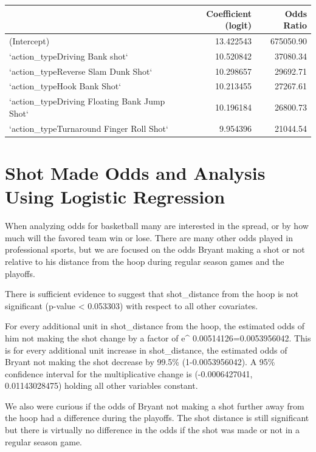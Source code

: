 \documentclass[american,]{article}
\begin{document}
\begin{table}[H]
\centering
\begin{tabular}{lrr}
\toprule
  & Coefficient (logit) & Odds Ratio\\
\midrule
\rowcolor{gray!6}  (Intercept) & 13.422543 & 675050.90\\
`action\_typeDriving Bank shot` & 10.520842 & 37080.34\\
\rowcolor{gray!6}  `action\_typeReverse Slam Dunk Shot` & 10.298657 & 29692.71\\
`action\_typeHook Bank Shot` & 10.213455 & 27267.61\\
\rowcolor{gray!6}  `action\_typeDriving Floating Bank Jump Shot` & 10.196184 & 26800.73\\
\addlinespace
`action\_typeTurnaround Finger Roll Shot` & 9.954396 & 21044.54\\
\bottomrule
\end{tabular}
\end{table}

\hypertarget{shot-made-odds-and-analysis-using-logistic-regression}{%
\section{\texorpdfstring{\textbf{Shot Made Odds and Analysis Using Logistic Regression}}{Shot Made Odds and Analysis Using Logistic Regression}}\label{shot-made-odds-and-analysis-using-logistic-regression}}

When analyzing odds for basketball many are interested in the spread, or by how much will the favored team win or lose. There are many other odds played in professional sports, but we are focused on the odds Bryant making a shot or not relative to his distance from the hoop during regular season games and the playoffs.

There is sufficient evidence to suggest that shot\_distance from the hoop is not significant (p-value \textless{} 0.053303) with respect to all other covariates.

For every additional unit in shot\_distance from the hoop, the estimated odds of him not making the shot change by a factor of e\^{} 0.00514126=0.0053956042. This is for every additional unit increase in shot\_distance, the estimated odds of Bryant not making the shot decrease by 99.5\% (1-0.0053956042). A 95\% confidence interval for the multiplicative change is (-0.0006427041, 0.01143028475) holding all other variables constant.

We also were curious if the odds of Bryant not making a shot further away from the hoop had a difference during the playoffs. The shot distance is still significant but there is virtually no difference in the odds if the shot was made or not in a regular season game.
\end{document}
